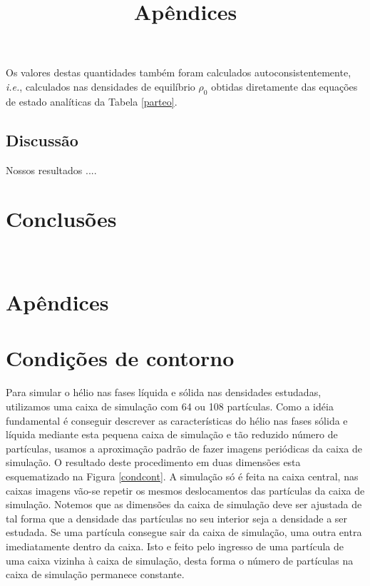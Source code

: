 \documentclass[12pt,twoside,a4paper]{report}
\begin{document}
Os valores destas quantidades também foram calculados
autoconsistentemente, {\sl i.e.}, calculados nas densidades de equilíbrio $\rho_0$
obtidas
diretamente das equações de estado analíticas da Tabela \ref{parteo}. 

\section{Discussão}
Nossos resultados ....


\chapter{Conclusões} \label{conclusões}

\newpage

$ $

\newpage






\chapter*{Apêndices}


\appendix
\title{Apêndices}

\chapter{Condições de contorno} \label{ccon}

Para simular o hélio nas fases líquida e sólida nas
densidades estudadas, utilizamos uma caixa de simulação com 64 ou 108
partículas. Como a idéia fundamental é conseguir descrever as
características do hélio nas fases sólida e líquida mediante esta pequena
caixa de simulação e tão reduzido número de partículas, usamos a
aproximação padrão de fazer imagens periódicas da caixa de simulação. O resultado
deste
procedimento em duas dimensões esta esquematizado na Figura
\ref{condcont}. A simulação
só é feita na caixa central, nas caixas imagens vão-se repetir os
mesmos deslocamentos das partículas da caixa de simulação. Notemos
que as dimensões da caixa de simulação deve ser ajustada de tal forma
que a densidade das partículas no seu interior seja a densidade a ser
estudada. Se uma partícula consegue sair da caixa de simulação, uma outra 
entra imediatamente
dentro da caixa. Isto e feito pelo ingresso de uma partícula de uma caixa 
vizinha à caixa de
simulação, desta
forma o número de partículas na caixa de simulação permanece constante.
\end{document}
